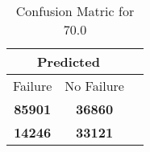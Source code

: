 \begin{table}[] 
\caption{Confusion Matric for 70.0} 
\label{Table: Prediction Accuracy-DMD70.0OnlySunEKF-combinationReflection-Reflection} 
\centering 
\begin{tabular} 
 {@{}ccc@{}} 
\toprule 
\multicolumn{2}{c}{\textbf{Predicted}}
 \\ \midrule 
\multicolumn{1}{|c|}{Failure} & 
\multicolumn{1}{c|}{No Failure}
 \\ \midrule 
\multicolumn{1}{|c|}{\color{green}\textbf{85901}} & 
\multicolumn{1}{c|}{\color{green}\textbf{36860}}
 \\ \midrule 
\multicolumn{1}{|c|}{\color{red}\textbf{14246}} & 
\multicolumn{1}{c|}{\color{red}\textbf{33121}}
 \\ \bottomrule 
\end{tabular} 
\end{table} 
